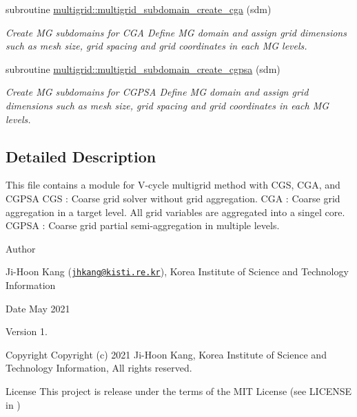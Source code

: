 \textbf{ }\par
\begin{DoxyCompactItemize}
\item 
subroutine \hyperlink{namespacemultigrid_ae33e2e076cc087e7d149a3150c1ca1af}{multigrid\+::multigrid\+\_\+subdomain\+\_\+create\+\_\+cga} (sdm)
\begin{DoxyCompactList}\small\item\em Create MG subdomains for C\+GA  Define MG domain and assign grid dimensions such as mesh size, grid spacing and grid coordinates in each MG levels. \end{DoxyCompactList}\end{DoxyCompactItemize}

\textbf{ }\par
\begin{DoxyCompactItemize}
\item 
subroutine \hyperlink{namespacemultigrid_aa2eb7c900fb5875f844c04c27c552373}{multigrid\+::multigrid\+\_\+subdomain\+\_\+create\+\_\+cgpsa} (sdm)
\begin{DoxyCompactList}\small\item\em Create MG subdomains for C\+G\+P\+SA  Define MG domain and assign grid dimensions such as mesh size, grid spacing and grid coordinates in each MG levels. \end{DoxyCompactList}\end{DoxyCompactItemize}



\subsection{Detailed Description}
This file contains a module for V-\/cycle multigrid method with C\+GS, C\+GA, and C\+G\+P\+SA  C\+GS \+: Coarse grid solver without grid aggregation. C\+GA \+: Coarse grid aggregation in a target level. All grid variables are aggregated into a singel core. C\+G\+P\+SA \+: Coarse grid partial semi-\/aggregation in multiple levels. 

\begin{DoxyAuthor}{Author}

\begin{DoxyItemize}
\item Ji-\/\+Hoon Kang (\href{mailto:jhkang@kisti.re.kr}{\tt jhkang@kisti.\+re.\+kr}), Korea Institute of Science and Technology Information
\end{DoxyItemize}
\end{DoxyAuthor}
\begin{DoxyDate}{Date}
May 2021 
\end{DoxyDate}
\begin{DoxyVersion}{Version}
1. 
\end{DoxyVersion}
\begin{DoxyParagraph}{Copyright}
Copyright (c) 2021 Ji-\/\+Hoon Kang, Korea Institute of Science and Technology Information, All rights reserved. 
\end{DoxyParagraph}
\begin{DoxyParagraph}{License }
This project is release under the terms of the M\+IT License (see L\+I\+C\+E\+N\+SE in ) 
\end{DoxyParagraph}
